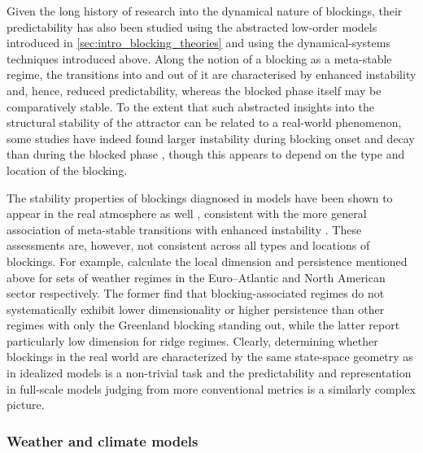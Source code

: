 Given the long history of research into the dynamical nature of blockings,
their predictability has also been studied using the abstracted low-order
models introduced in \cref{sec:intro_blocking_theories} and using the
dynamical-systems techniques introduced above. Along the notion of
a blocking as a meta-stable regime, the transitions into and out of it are
characterised by enhanced instability and, hence, reduced predictability,
whereas the blocked phase itself may be comparatively stable. To the extent
that such abstracted insights into the structural stability of the attractor
can be related to a real-world phenomenon, some studies have indeed found
larger instability during blocking onset and decay than during the blocked
phase \parencite{schubertDynamicalAnalysisBlocking2016,
    lucariniNewMathematicalFramework2020, hamiltonUsingUnstablePeriodic2025},
though this appears to depend on the type and location of the blocking.

The stability properties
of blockings diagnosed in models have been shown to appear in the real
atmosphere as well \parencite{quinnDynamicalAnalysisReduced2021,
    axelsenHyperbolicitySouthernHemisphere2025}, consistent with the more
general association of meta-stable transitions with enhanced instability
\parencite{farandaSwitchingZonalBlocked2016, farandaDynamicalProxiesNorth2017,
    quinnSystematicCalculationFinitetime2022}. These assessments are, however,
not consistent across all types and locations of blockings. For example,
\textcite{hochmanAtlanticeuropeanWeatherRegimes2021,
    leeDynamicalFootprintYearround2024} calculate the local dimension and persistence
mentioned above for sets of weather regimes in the Euro--Atlantic
\parencite{gramsBalancingEuropesWindpower2017} and
North American sector respectively. The former find that
blocking-associated regimes do not systematically exhibit lower dimensionality
or higher persistence than other regimes with only the Greenland blocking
standing out,
while the latter report particularly low dimension for ridge regimes.
Clearly, determining whether blockings in the real world are characterized
by the same state-space geometry as in idealized models is a non-trivial task
and the predictability and representation in full-scale models judging from
more conventional metrics is a similarly complex picture.

\subsubsection{Weather and climate models}

